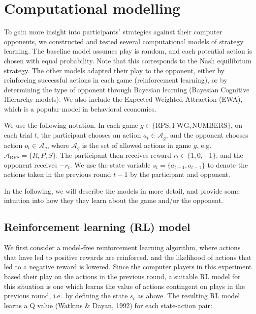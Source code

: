 \documentclass[man,floatsintext]{apa6}
\begin{document}
\newpage

\hypertarget{computational-modelling}{%
\section{Computational modelling}\label{computational-modelling}}

To gain more insight into participants' strategies against their computer opponents, we constructed and tested several computational models of strategy learning. The baseline model assumes play is random, and each potential action is chosen with equal probability. Note that this corresponds to the Nash equilibrium strategy. The other models adapted their play to the opponent, either by reinforcing successful actions in each game (reinforcement learning), or by determining the type of opponent through Bayesian learning (Bayesian Cognitive Hierarchy models). We also include the Expected Weighted Attraction (EWA), which is a popular model in behavioral economics.

We use the following notation. In each game \(g \in \{\text{RPS},\text{FWG}, \text{NUMBERS}\}\), on each trial \(t\), the participant chooses an action \(a_t \in \mathcal{A}_g\), and the opponent chooses action \(o_t \in \mathcal{A}_g\), where \(\mathcal{A}_g\) is the set of allowed actions in game \(g\), e.g. \(\mathcal{A}_\text{RPS} = \{R,P,S\}\). The participant then receives reward \(r_t \in \{1,0,-1\}\), and the opponent receives \(-r_t\). We use the state variable \(s_t = \{a_{t-1},o_{t-1}\}\) to denote the actions taken in the previous round \(t-1\) by the participant and opponent.

In the following, we will describe the models in more detail, and provide some intuition into how they they learn about the game and/or the opponent.

\hypertarget{reinforcement-learning-rl-model}{%
\subsection{Reinforcement learning (RL) model}\label{reinforcement-learning-rl-model}}

We first consider a model-free reinforcement learning algorithm, where actions that have led to positive rewards are reinforced, and the likelihood of actions that led to a negative reward is lowered. Since the computer players in this experiment based their play on the actions in the previous round, a suitable RL model for this situation is one which learns the value of actions contingent on plays in the previous round, i.e.~by defining the state \(s_{t}\) as above. The resulting RL model learns a Q value (Watkins \& Dayan, 1992) for each state-action pair:
\end{document}
